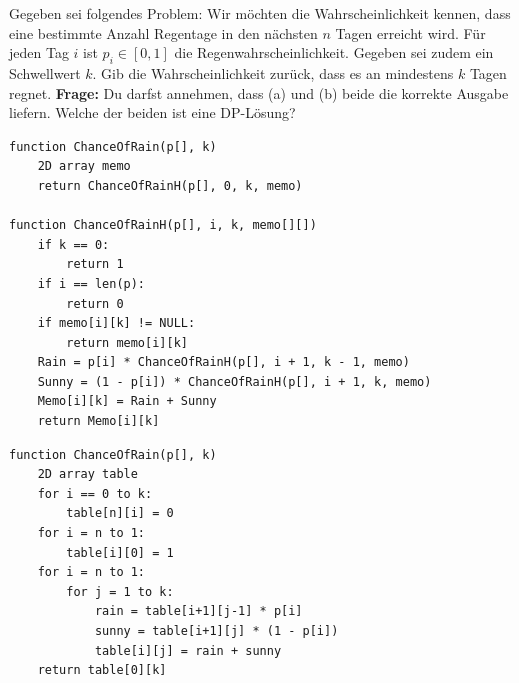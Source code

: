 \begin{contentbox}
Gegeben sei folgendes Problem: Wir möchten die Wahrscheinlichkeit kennen, dass eine bestimmte Anzahl Regentage in den nächsten $n$ Tagen erreicht wird. Für jeden Tag $i$ ist $p_i \in [0, 1]$ die Regenwahrscheinlichkeit. Gegeben sei zudem ein Schwellwert $k$. Gib die Wahrscheinlichkeit zurück, dass es an mindestens $k$ Tagen regnet.
\textbf{Frage:} Du darfst annehmen, dass (a) und (b) beide die korrekte Ausgabe liefern. Welche der beiden ist eine DP-Lösung?
\end{contentbox}
\begin{codebox}
\begin{lstlisting}[style=CodeExpert]
function ChanceOfRain(p[], k)
    2D array memo
    return ChanceOfRainH(p[], 0, k, memo)

function ChanceOfRainH(p[], i, k, memo[][])
    if k == 0:
        return 1
    if i == len(p):
        return 0
    if memo[i][k] != NULL:
        return memo[i][k]
    Rain = p[i] * ChanceOfRainH(p[], i + 1, k - 1, memo)
    Sunny = (1 - p[i]) * ChanceOfRainH(p[], i + 1, k, memo)
    Memo[i][k] = Rain + Sunny
    return Memo[i][k]
\end{lstlisting}
\end{codebox}
\begin{codebox}
\begin{lstlisting}[style=CodeExpert]
function ChanceOfRain(p[], k)
    2D array table
    for i == 0 to k:
        table[n][i] = 0
    for i = n to 1:
        table[i][0] = 1
    for i = n to 1:
        for j = 1 to k:
            rain = table[i+1][j-1] * p[i]
            sunny = table[i+1][j] * (1 - p[i])
            table[i][j] = rain + sunny
    return table[0][k]
\end{lstlisting}
\end{codebox}


